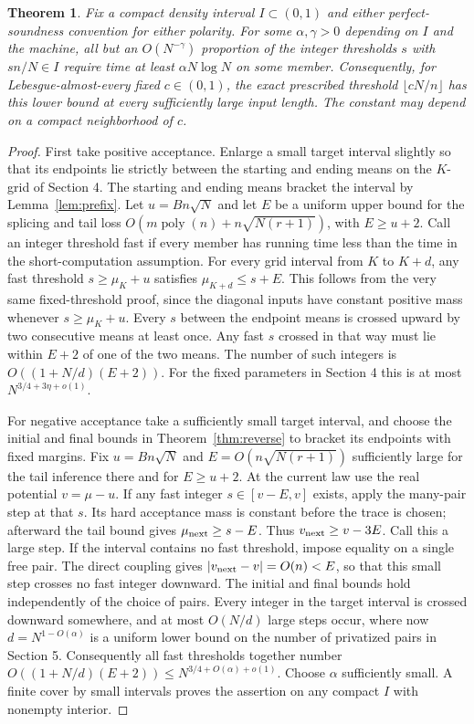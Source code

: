 \documentclass[11pt]{article}
\newtheorem{theorem}{Theorem}
\begin{document}
\begin{theorem}\label{thm:most}
Fix a compact density interval $I\subset(0,1)$ and either perfect-soundness convention for either polarity. For some $\alpha,\gamma>0$ depending on $I$ and the machine, all but an $O(N^{-\gamma})$ proportion of the integer thresholds $s$ with $sn/N\in I$ require time at least $\alpha N\log N$ on some member. Consequently, for Lebesgue-almost-every fixed $c\in(0,1)$, the exact prescribed threshold $\lfloor cN/n\rfloor$ has this lower bound at every sufficiently large input length. The constant may depend on a compact neighborhood of $c$.
\end{theorem}
\begin{proof}
First take positive acceptance. Enlarge a small target interval slightly so that its endpoints lie strictly between the starting and ending means on the $K$-grid of Section 4. The starting and ending means bracket the interval by Lemma~\ref{lem:prefix}. Let $u=Bn\sqrt N$ and let $E$ be a uniform upper bound for the splicing and tail loss $O(m\operatorname{poly}(n)+n\sqrt{N(r+1)})$, with $E\ge u+2$. Call an integer threshold fast if every member has running time less than the time in the short-computation assumption. For every grid interval from $K$ to $K+d$, any fast threshold $s\ge\mu_K+u$ satisfies $\mu_{K+d}\le s+E$. This follows from the very same fixed-threshold proof, since the diagonal inputs have constant positive mass whenever $s\ge\mu_K+u$. Every $s$ between the endpoint means is crossed upward by two consecutive means at least once. Any fast $s$ crossed in that way must lie within $E+2$ of one of the two means. The number of such integers is $O((1+N/d)(E+2))$. For the fixed parameters in Section 4 this is at most $N^{3/4+3\eta+o(1)}$.

For negative acceptance take a sufficiently small target interval, and choose the initial and final bounds in Theorem~\ref{thm:reverse} to bracket its endpoints with fixed margins. Fix $u=Bn\sqrt N$ and $E=O(n\sqrt{N(r+1)})$ sufficiently large for the tail inference there and for $E\ge u+2$. At the current law use the real potential $v=\mu-u$. If any fast integer $s\in[v-E,v]$ exists, apply the many-pair step at that $s$. Its hard acceptance mass is constant before the trace is chosen; afterward the tail bound gives $\mu_{\rm next}\ge s-E$. Thus $v_{\rm next}\ge v-3E$. Call this a large step. If the interval contains no fast threshold, impose equality on a single free pair. The direct coupling gives $|v_{\rm next}-v|=O(n)<E$, so that this small step crosses no fast integer downward. The initial and final bounds hold independently of the choice of pairs. Every integer in the target interval is crossed downward somewhere, and at most $O(N/d)$ large steps occur, where now $d=N^{1-O(\alpha)}$ is a uniform lower bound on the number of privatized pairs in Section 5. Consequently all fast thresholds together number $O((1+N/d)(E+2))\le N^{3/4+O(\alpha)+o(1)}$. Choose $\alpha$ sufficiently small. A finite cover by small intervals proves the assertion on any compact $I$ with nonempty interior.


\end{proof}
\end{document}

